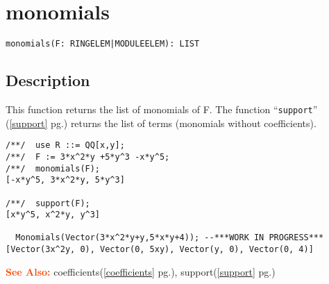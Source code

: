 \documentclass[a4paper]{mybook}
\newenvironment{command}{}{} %
\newcommand\SeeAlso{\par\textcolor{OrangeRed}{\textbf{\large See Also: }}}
\begin{document}
\section{monomials}
\label{monomials}
\begin{command} %


\begin{Verbatim}[label=syntax, rulecolor=\color{MidnightBlue},
frame=single]
monomials(F: RINGELEM|MODULEELEM): LIST
\end{Verbatim}


\subsection*{Description}

This function returns the list of monomials of F.
The function ``\verb&support&'' (\ref{support} pg.\pageref{support}) returns the list of terms
(monomials without coefficients).
\begin{Verbatim}[label=example, rulecolor=\color{PineGreen}, frame=single]
/**/  use R ::= QQ[x,y];
/**/  F := 3*x^2*y +5*y^3 -x*y^5;
/**/  monomials(F);
[-x*y^5, 3*x^2*y, 5*y^3]

/**/  support(F);
[x*y^5, x^2*y, y^3]

  Monomials(Vector(3*x^2*y+y,5*x*y+4)); --***WORK IN PROGRESS***
[Vector(3x^2y, 0), Vector(0, 5xy), Vector(y, 0), Vector(0, 4)]
\end{Verbatim}


\SeeAlso %
  coefficients(\ref{coefficients} pg.\pageref{coefficients}), 
    support(\ref{support} pg.\pageref{support})
\end{command} %
\end{document}

